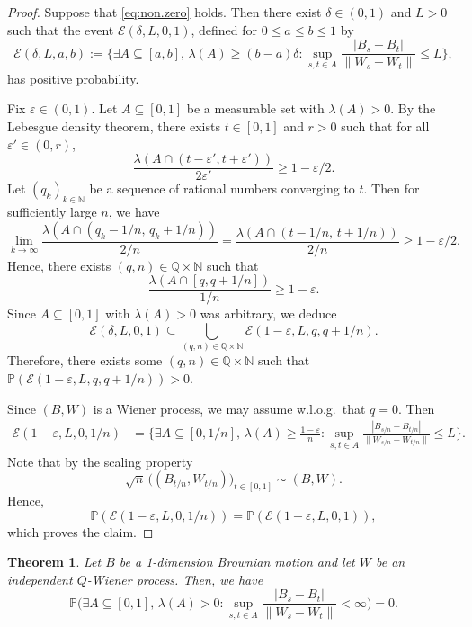 \documentclass[a4paper]{amsart}
\newtheorem{theorem}{Theorem}
\numberwithin{theorem}{section}
\theoremstyle{definition}
\renewcommand{\epsilon}{\varepsilon}
\begin{document}
\begin{proof}
    Suppose that \eqref{eq:non.zero} holds. 
    Then there exist $\delta \in (0,1)$ and $L > 0$ such that the event $\mathcal E(\delta,L,0,1)$, defined for $0 \le a \le b \le 1$ by
    \[
        \mathcal E(\delta,L,a,b) := \Big\{ \exists A \subseteq [a,b], \, \lambda(A) \ge (b-a) \delta : \sup_{s,t \in A} \frac{|B_s - B_t|}{\|W_s - W_t\|} \le L \Big\},
    \]
    has positive probability.
    
    Fix $\epsilon \in (0,1)$. 
    Let $A \subseteq [0,1]$ be a measurable set with $\lambda(A) > 0$. 
    By the Lebesgue density theorem, there exists $t \in [0,1]$ and $r > 0$ such that for all $\epsilon' \in (0,r)$,
    \[
        \frac{\lambda(A \cap (t-\epsilon',t+\epsilon'))}{2\epsilon'} \ge 1 - \epsilon/2.
    \]
    Let $(q_k)_{k \in \mathbb N}$ be a sequence of rational numbers converging to $t$. 
    Then for sufficiently large $n$, we have
    \[
        \lim_{k \to \infty}
        \frac{\lambda(A \cap (q_k - 1/n, \, q_k + 1/n))}{2/n} 
        = \frac{\lambda(A \cap (t - 1/n, \, t + 1/n))}{2/n} 
        \ge 1 - \epsilon/2.
    \]
    Hence, there exists $(q,n) \in \mathbb Q \times \mathbb N$ such that
    \[
        \frac{\lambda(A \cap [q, q+1/n])}{1/n} \ge 1 - \epsilon.
    \]
    Since $A \subseteq [0,1]$ with $\lambda(A) > 0$ was arbitrary, we deduce
    \[
        \mathcal E(\delta,L,0,1) \subseteq \bigcup_{(q,n) \in \mathbb Q \times \mathbb N} \mathcal E(1 - \epsilon ,L,q,q+1/n).
    \]
    Therefore, there exists some $(q,n) \in \mathbb Q \times \mathbb N$ such that $\mathbb P(\mathcal E(1 - \epsilon,L,q,q+1/n)) > 0$.
    
    Since $(B,W)$ is a Wiener process, we may assume w.l.o.g.\ that $q = 0$. 
    Then
    \begin{align*}
        \mathcal E(1-\epsilon,L,0,1/n) 
        &= \Big\{ \exists A \subseteq [0,1/n], \, \lambda(A) \ge \frac{1 - \epsilon}{n} : 
        \sup_{s,t\in A} \frac{|B_{s/n} - B_{t/n}|}{\|W_{s/n} - W_{t/n}\|} \le L \Big\}.
    \end{align*}
    Note that by the scaling property
    \[
        \sqrt{n}\,\big((B_{t/n},W_{t/n}))_{t \in [0,1]} \sim (B,W).
    \]
    Hence,
    \[
        \mathbb P(\mathcal E(1 - \epsilon, L, 0, 1/n)) = \mathbb P(\mathcal E(1 - \epsilon, L, 0, 1)),
    \]
    which proves the claim.
\end{proof}

\begin{theorem} \label{thm:nolip}
    Let $B$ be a 1-dimension Brownian motion and let $W$ be an independent $Q$-Wiener process.
    Then, we have
    \begin{equation}
        \label{eq:thm.nolip}
        \mathbb P\Big( \exists A \subseteq [0,1], \, \lambda(A) > 0 : \sup_{s,t \in A} \frac{|B_s - B_t|}{\|W_s - W_t\|} < \infty \Big) = 0.
    \end{equation}
\end{theorem}
\end{document}
